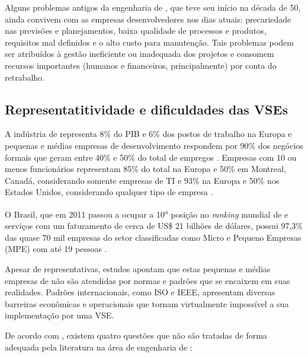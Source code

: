 Alguns problemas antigos da engenharia de \sw, que teve seu início na década de 50, ainda convivem com as empresas desenvolvedores nos dias atuais: precariedade  nas  previsões  e  planejamentos, baixa qualidade de processos e produtos, requisitos  mal  definidos e o alto custo para manutenção. Tais problemas podem ser atribuídos à gestão ineficiente ou inadequada dos projetos e consomem recursos importantes (humanos e financeiros, principalmente) por conta do retrabalho.

\subsection{Representatitividade e dificuldades das VSEs}

A indústria de \sw representa 8\% do PIB e 6\% dos postos de trabalho na Europa e pequenas e médias empresas de desenvolvimento respondem por 90\% dos negócios formais que geram entre 40\% e 50\% do total de empregos \citep{reicis}. Empresas com 10 ou menos funcionários representam 85\% do total na Europa e 50\% em Montreal, Canadá, considerando somente empresas de TI e 93\% na Europa e 50\% nos Estados Unidos, considerando qualquer tipo de empresa \citep{ieee_comp}. 

O Brasil, que em 2011 passou a ocupar a 10\textsuperscript{a} posição no \textit{ranking} mundial de \sw e serviços com um faturamento de cerca de US\$ 21 bilhões de dólares, possui 97,3\% das quase 70 mil empresas do setor classificadas como Micro e Pequeno Empresas (MPE) com até 19 pessoas \citep{guia.sebrae}.

Apesar de representativas, estudos apontam que estas pequenas e médias empresas de \sw não são atendidas por normas e padrões que se encaixem em suas realidades. Padrões internacionais, como ISO e IEEE, apresentam diversas barreiras econômicas e operacionais que tornam virtualmente impossível a sua implementação por uma VSE.

De acordo com \cite{fayad}, existem quatro questões que não são tratadas de forma adequada pela literatura na área de engenharia de \sw:

